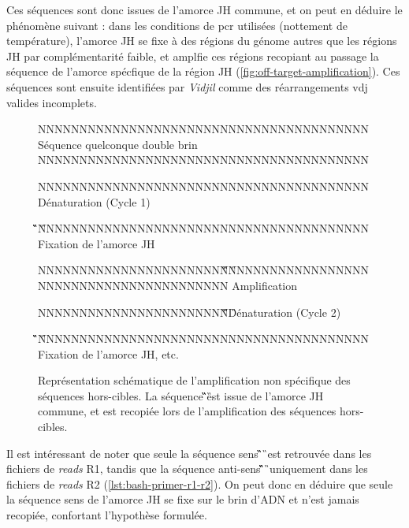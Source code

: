 \vspace{1em}

Ces séquences sont donc issues de l'amorce JH commune, et on peut en déduire le phénomène suivant :
dans les conditions de \gls{pcr} utilisées (nottement de température), l'amorce JH se fixe à des régions 
du génome autres que les régions JH par complémentarité faible, et amplfie ces régions recopiant au passage 
la séquence de l'amorce spécfique de la région JH (\autoref{fig:off-target-amplification}). Ces séquences sont ensuite 
identifiées par \textit{Vidjil} comme des réarrangements \gls{vdj} valides incomplets. 

\begin{figure}[H]
    \centering
    \begin{ColoredVerbatim}
        
        NNNNNNNNNNNNNNNNNNNNNNNNNNNNNNNNNNNNNNNN Séquence quelconque double brin
        NNNNNNNNNNNNNNNNNNNNNNNNNNNNNNNNNNNNNNNN

        NNNNNNNNNNNNNNNNNNNNNNNNNNNNNNNNNNNNNNNN Dénaturation (Cycle 1)

                               \C\G\T\C\T\C\C\T\C\A\G\G\T\A\A\G
        NNNNNNNNNNNNNNNNNNNNNNNNNNNNNNNNNNNNNNNN Fixation de l'amorce JH


        NNNNNNNNNNNNNNNNNNNNNNN\C\G\T\C\T\C\C\T\C\A\G\G\T\A\A\G
        NNNNNNNNNNNNNNNNNNNNNNNNNNNNNNNNNNNNNNNN Amplification

        NNNNNNNNNNNNNNNNNNNNNNN\C\G\T\C\T\C\C\T\C\A\G\G\T\A\A\G Dénaturation (Cycle 2)

                               \C\G\T\C\T\C\C\T\C\A\G\G\T\A\A\G
        NNNNNNNNNNNNNNNNNNNNNNNNNNNNNNNNNNNNNNNN Fixation de l'amorce JH, etc.
    \end{ColoredVerbatim}
    \caption{
        Représentation schématique de l'amplification non spécifique des séquences hors-cibles. 
        La séquence \C\G\T\C\T\C\C\T\C\A\G\G\T\A\A\G est issue de l'amorce JH commune, et est recopiée 
        lors de l'amplification des séquences hors-cibles.
    }
    \label{fig:off-target-amplification}
\end{figure}

Il est intéressant de noter que seule la séquence sens \C\G\T\C\T\C\C\T\C\A\G\G\T\A\A\G\ est retrouvée dans les fichiers de \textit{reads} 
R1, tandis que la séquence anti-sens \C\T\T\A\C\C\T\G\A\G\G\A\G\A\C\G\ uniquement dans les fichiers de \textit{reads} 
R2 (\autoref{lst:bash-primer-r1-r2}). On peut donc en déduire que seule la séquence sens de l'amorce JH se fixe sur 
le brin d'ADN et n'est jamais recopiée, confortant l'hypothèse formulée.

